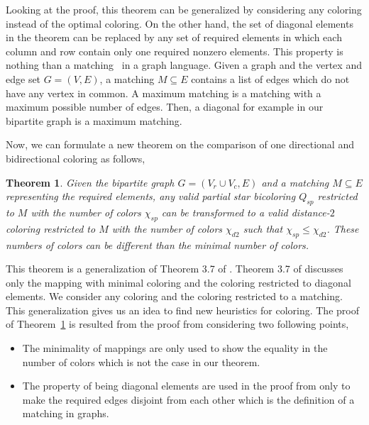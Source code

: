 \documentclass[12pt, twoside,a4paper,toc=bibliography]{scrbook}
\newtheorem{theorem}{Theorem}
\begin{document}
Looking at the proof, this theorem can be generalized by considering any
coloring instead of the optimal coloring.
On the other hand, the set of diagonal elements in the theorem
can be replaced by any set of required elements
in which each column and row contain only one required nonzero elements.
This property is nothing than a matching~\cite{bondy2008graph} in a graph language.
Given a graph and the vertex and edge set $G=(V,E)$, a matching $M\subseteq E$ contains
a list of edges which do not have any vertex in common.
A maximum matching is a matching with a maximum possible number of edges.
Then, a diagonal for example in our bipartite graph is a maximum matching.

Now, we can formulate a new theorem on the comparison of one directional and
bidirectional coloring as follows,
\begin{theorem}
\label{t.matching}
Given the bipartite graph $G=(V_r\cup V_c,E)$ and a matching $M\subseteq E$ representing
the required elements, any valid partial star bicoloring $Q_{sp}$ restricted to $M$
with the number of colors $\chi_{sp}$
can be transformed to a valid distance-$2$ coloring restricted to $M$
with the number of colors $\chi_{d2}$ such that $\chi_{sp} \leq \chi_{d2}$.
These numbers of colors can be different than the minimal number of colors.
\end{theorem}
This theorem is a generalization of Theorem 3.7 of \cite{Lulfesmann2012Fap}.
Theorem 3.7 of \cite{Lulfesmann2012Fap} discusses only the mapping with minimal coloring
and the coloring restricted to diagonal elements. We consider any coloring
and the coloring restricted to a matching. This generalization gives us an idea
to find new heuristics for coloring. The proof of Theorem~\ref{t.matching}
is resulted from the proof from \cite{Lulfesmann2012Fap} considering two following points,
\begin{itemize}
\item The minimality of mappings are only used to show the equality in the number of colors which is not
the case in our theorem.
\item The property of being diagonal elements are used in the proof from \cite{Lulfesmann2012Fap} only to
make the required edges disjoint from each other which is the definition of a matching in graphs.
\end{itemize}
\end{document}
